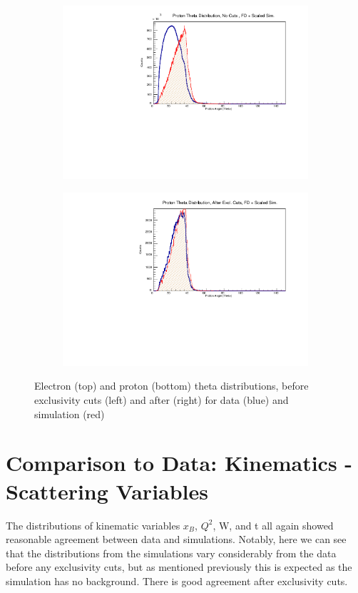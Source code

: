 \begin{figure}
\begin{subfigure}{.45\textwidth}
                \includegraphics[width=1\textwidth]{figures/Simulation/kinematics_basic/hist_proton_theta_nocut_fd_Double.pdf}
            \end{subfigure}%
            \begin{subfigure}{.45\textwidth}
                \centering
                \includegraphics[width=1\textwidth]{figures/Simulation/kinematics_basic/hist_proton_theta_excut_fd_Double.pdf}
            \end{subfigure}
            \caption[short]{Electron (top) and proton (bottom) theta distributions, before exclusivity cuts (left) and after (right) for data (blue) and simulation (red)}
        \end{figure} 

    \clearpage

\section{Comparison to Data: Kinematics - Scattering Variables}
    The distributions of kinematic variables $x_B$, $Q^2$, W, and t all again showed reasonable agreement between data and simulations. Notably, here we can see that the distributions from the simulations vary considerably from the data before any exclusivity cuts, but as mentioned previously this is expected as the simulation has no background. There is good agreement after exclusivity cuts. 
    
